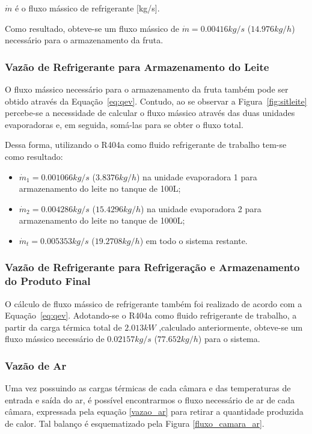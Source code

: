 \documentclass[10pt,a4paper]{article}
\begin{document}
$\dot{m}$ é o fluxo mássico de refrigerante [kg/s].

Como resultado, obteve-se um fluxo mássico de $\dot{m} = 0.00416 kg/s$ ($14.976 kg/h$) necessário para o armazenamento da fruta.

\subsubsection{{Vazão de Refrigerante para Armazenamento do Leite}}
O fluxo mássico necessário para o armazenamento da fruta também pode ser obtido através da Equação~\ref{eq:qev}. Contudo, ao se observar a Figura~\ref{fig:sitleite} percebe-se a necessidade de calcular o fluxo mássico através das duas unidades evaporadoras e, em seguida, somá-las para se obter o fluxo total.

Dessa forma, utilizando o R404a como fluido refrigerante de trabalho tem-se como resultado:
\begin{itemize}
    \item $\dot{m}_1 = 0.001066 kg/s$ ($3.8376 kg/h$) na unidade evaporadora 1 para armazenamento do leite no tanque de 100L;
    \item $\dot{m}_2 = 0.004286 kg/s$ ($15.4296 kg/h$) na unidade evaporadora 2 para armazenamento do leite no tanque de 1000L;
    \item $\dot{m}_t = 0.005353 kg/s$ ($19.2708 kg/h$) em todo o sistema restante.
\end{itemize}

\subsubsection{{Vazão de Refrigerante para Refrigeração e Armazenamento do Produto Final}}
O cálculo de fluxo mássico de refrigerante também foi realizado de acordo com a Equação~\ref{eq:qev}. Adotando-se o R404a como fluido refrigerante de trabalho, a partir da carga térmica total de $2.013 kW$ ,calculado anteriormente, obteve-se um fluxo mássico necessário de $0.02157 kg/s$ ($77.652 kg/h$) para o sistema.

\subsubsection{{Vazão de Ar}}
Uma vez possuindo as cargas térmicas de cada câmara e das temperaturas de entrada e saída do ar, é possível encontrarmos o fluxo necessário de ar de cada câmara, expressada pela equação \ref{vazao_ar} para retirar a quantidade produzida de calor. Tal balanço é esquematizado pela Figura \ref{fluxo_camara_ar}.
\end{document}

